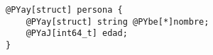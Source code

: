 \begin{Verbatim}[commandchars=@\[\]]
@PYay[struct] persona {
    @PYay[struct] string @PYbe[*]nombre;
    @PYaJ[int64_t] edad;
}
\end{Verbatim}

